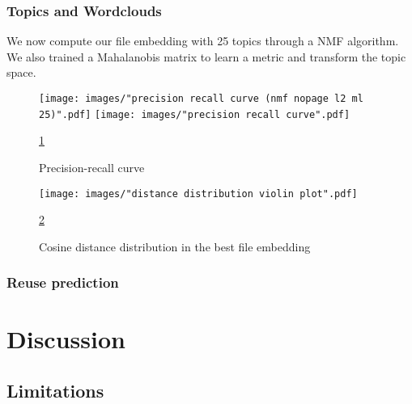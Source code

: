 \documentclass[a4paper]{article}
\begin{document}
	\subsubsection{Topics and Wordclouds}
	
	We now compute our file embedding with 25 topics through a \ac{NMF} algorithm. We also trained a Mahalanobis matrix to learn a metric and transform the topic space. 
	
	\begin{figure}[]
		\texttt{[image: images/"precision recall curve (nmf nopage l2 ml 25)".pdf]}
		\label{fig:prc-gridsearch}
		\endminipage\hfill
		\texttt{[image: images/"precision recall curve".pdf]}
		\label{fig:prc-best}
		\endminipage
		\caption{Precision-recall curve}
		\label{fig:prc}
		\ref{fig:prc}
	\end{figure}
	
	\begin{figure}
		\centering
		\texttt{[image: images/"distance distribution violin plot".pdf]}
		\caption{Cosine distance distribution in the best file embedding}
		\ref{fig:distance-distribution}
		\label{fig:distance-distribution}
	\end{figure}
	
	\subsubsection{Reuse prediction}
	
	
	
	\section{Discussion}
	
	\subsection{Limitations}
	
\end{document}

